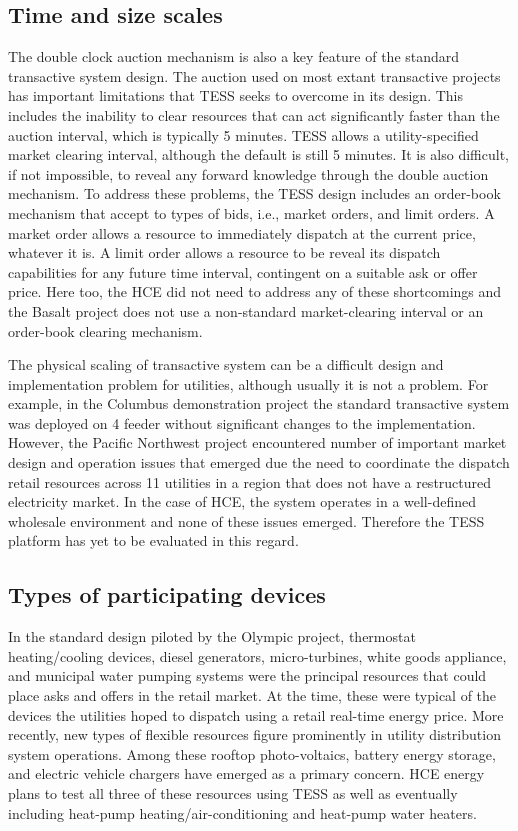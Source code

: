 \subsection{Time and size scales}

The double clock auction mechanism is also a key feature of the standard transactive system design.  The auction used on most extant transactive projects has important limitations that TESS seeks to overcome in its design.  This includes the inability to clear resources that can act significantly faster than the auction interval, which is typically 5 minutes. TESS allows a utility-specified market clearing interval, although the default is still 5 minutes.  It is also difficult, if not impossible, to reveal any forward knowledge through the double auction  mechanism. To address these problems, the TESS design includes an order-book mechanism that accept to types of bids, i.e., market orders, and limit orders.  A market order allows a resource to immediately dispatch at the current price, whatever it is.  A limit order allows a resource to be reveal its dispatch capabilities for any future time interval, contingent on a suitable ask or offer price.  Here too, the HCE did not need to address any of these shortcomings and the Basalt project does not use a non-standard market-clearing interval or an order-book clearing mechanism.

The physical scaling of transactive system can be a difficult design and implementation problem for utilities, although usually it is not a problem. For example, in the Columbus demonstration project \cite{Widergren2014} the standard transactive system was deployed on 4 feeder without significant changes to the implementation.  However, the Pacific Northwest project \cite{hammerstrom_2015} encountered number of important market design and operation issues that emerged due the need to coordinate the dispatch retail resources across 11 utilities in a region that does not have a restructured electricity market.  In the case of HCE, the system operates in a well-defined wholesale environment and none of these issues emerged. Therefore the TESS platform has yet to be evaluated in this regard.

\subsection{Types of participating devices}

In the standard design piloted by the Olympic project, thermostat heating/cooling devices, diesel generators, micro-turbines, white goods appliance, and municipal water pumping systems were the principal resources that could place asks and offers in the retail market.  At the time, these were typical of the devices the utilities hoped to dispatch using a retail real-time energy price.  More recently, new types of flexible resources figure prominently in utility distribution system operations.  Among these rooftop photo-voltaics, battery energy storage, and electric vehicle chargers have emerged as a primary concern. HCE energy plans to test all three of these resources using TESS as well as eventually including heat-pump heating/air-conditioning and heat-pump water heaters.

